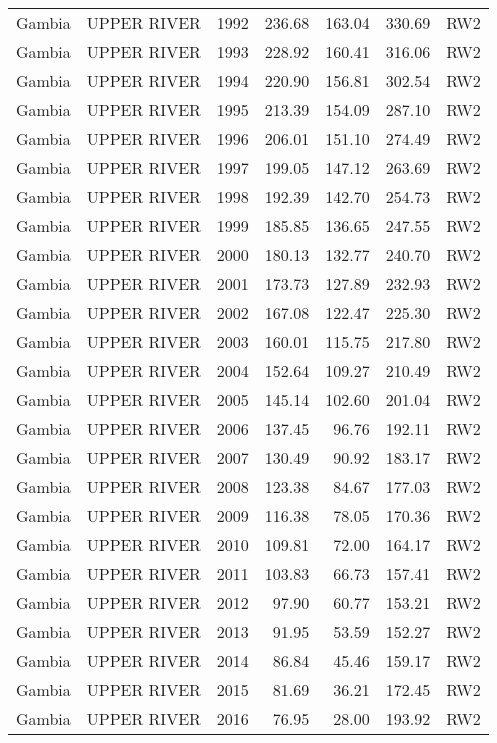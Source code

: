 \begin{longtable}{lllrrrl}
  Gambia & UPPER RIVER & 1992 & 236.68 & 163.04 & 330.69 & RW2 \\ 
  Gambia & UPPER RIVER & 1993 & 228.92 & 160.41 & 316.06 & RW2 \\ 
  Gambia & UPPER RIVER & 1994 & 220.90 & 156.81 & 302.54 & RW2 \\ 
  Gambia & UPPER RIVER & 1995 & 213.39 & 154.09 & 287.10 & RW2 \\ 
  Gambia & UPPER RIVER & 1996 & 206.01 & 151.10 & 274.49 & RW2 \\ 
  Gambia & UPPER RIVER & 1997 & 199.05 & 147.12 & 263.69 & RW2 \\ 
  Gambia & UPPER RIVER & 1998 & 192.39 & 142.70 & 254.73 & RW2 \\ 
  Gambia & UPPER RIVER & 1999 & 185.85 & 136.65 & 247.55 & RW2 \\ 
  Gambia & UPPER RIVER & 2000 & 180.13 & 132.77 & 240.70 & RW2 \\ 
  Gambia & UPPER RIVER & 2001 & 173.73 & 127.89 & 232.93 & RW2 \\ 
  Gambia & UPPER RIVER & 2002 & 167.08 & 122.47 & 225.30 & RW2 \\ 
  Gambia & UPPER RIVER & 2003 & 160.01 & 115.75 & 217.80 & RW2 \\ 
  Gambia & UPPER RIVER & 2004 & 152.64 & 109.27 & 210.49 & RW2 \\ 
  Gambia & UPPER RIVER & 2005 & 145.14 & 102.60 & 201.04 & RW2 \\ 
  Gambia & UPPER RIVER & 2006 & 137.45 & 96.76 & 192.11 & RW2 \\ 
  Gambia & UPPER RIVER & 2007 & 130.49 & 90.92 & 183.17 & RW2 \\ 
  Gambia & UPPER RIVER & 2008 & 123.38 & 84.67 & 177.03 & RW2 \\ 
  Gambia & UPPER RIVER & 2009 & 116.38 & 78.05 & 170.36 & RW2 \\ 
  Gambia & UPPER RIVER & 2010 & 109.81 & 72.00 & 164.17 & RW2 \\ 
  Gambia & UPPER RIVER & 2011 & 103.83 & 66.73 & 157.41 & RW2 \\ 
  Gambia & UPPER RIVER & 2012 & 97.90 & 60.77 & 153.21 & RW2 \\ 
  Gambia & UPPER RIVER & 2013 & 91.95 & 53.59 & 152.27 & RW2 \\ 
  Gambia & UPPER RIVER & 2014 & 86.84 & 45.46 & 159.17 & RW2 \\ 
  Gambia & UPPER RIVER & 2015 & 81.69 & 36.21 & 172.45 & RW2 \\ 
  Gambia & UPPER RIVER & 2016 & 76.95 & 28.00 & 193.92 & RW2 \\ 

\end{longtable}
